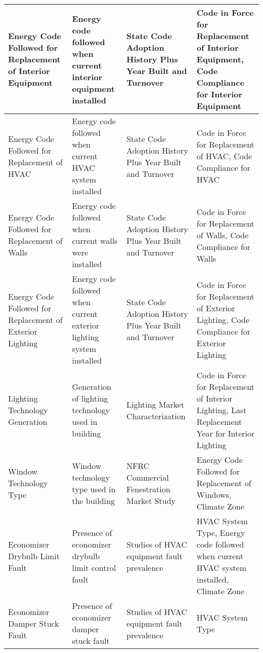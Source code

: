 \begin{center}
\begin{longtable}{|p{1.3in}|p{1.5in}|p{1.5in}|p{1.5in}|}
Energy Code Followed for Replacement of Interior Equipment      & Energy code followed when current interior equipment installed                 & State Code Adoption History Plus Year Built and Turnover    & Code in Force for Replacement of Interior Equipment, Code Compliance for Interior Equipment          \\ \hline
Energy Code Followed for Replacement of HVAC                    & Energy code followed when current HVAC system installed                        & State Code Adoption History Plus Year Built and Turnover    & Code in Force for Replacement of HVAC, Code Compliance for HVAC                                      \\ \hline
Energy Code Followed for Replacement of Walls                   & Energy code followed when current walls were installed                         & State Code Adoption History Plus Year Built and Turnover    & Code in Force for Replacement of Walls, Code Compliance for Walls                                    \\ \hline
Energy Code Followed for Replacement of Exterior Lighting       & Energy code followed when current exterior lighting system installed           & State Code Adoption History Plus Year Built and Turnover    & Code in Force for Replacement of Exterior Lighting, Code Compliance for Exterior Lighting            \\ \hline
Lighting Technology Generation                                  & Generation of lighting technology used in building                             & Lighting Market Characterization                            & Code in Force for Replacement of Interior Lighting, Last Replacement Year for Interior Lighting      \\ \hline
Window Technology Type                                          & Window technology type used in the building                                    & NFRC Commercial Fenestration Market Study                   & Energy Code Followed for Replacement of Windows, Climate Zone                                        \\ \hline
Economizer Drybulb Limit Fault                                  & Presence of economizer drybulb limit control fault                             & Studies of HVAC equipment fault prevalence                  & HVAC System Type, Energy code followed when current HVAC system installed, Climate Zone              \\ \hline
Economizer Damper Stuck Fault                                   & Presence of economizer damper stuck fault                                      & Studies of HVAC equipment fault prevalence                  & HVAC System Type                                                                                     \\ \hline
\end{longtable}
\end{center}